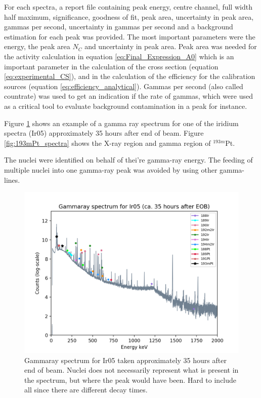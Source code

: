 For each spectra,  a report file containing peak energy, centre channel, full width half maximum, significance, goodness of fit, peak area, uncertainty in peak area, gammas per second, uncertainty in gammas per second and a background estimation for each peak was provided. The most important parameters were the energy, the peak area $N_C$ and uncertainty in peak area. Peak area was needed for the activity calculation in equation \ref{eq:Final_Expression_A0} which is an important parameter in the calculation of the cross section (equation \ref{eq:experimental_CS}), and in the calculation of the efficiency for the calibration sources (equation \ref{eq:efficiency_analytical}). Gammas per second (also called countrate) was used to get an indication if the rate of gammas, which were used as a critical tool to evaluate background contamination in a peak for instance. 

Figure \ref{fig:gammarayspectrum_example} shows an example of a gamma ray spectrum for one of the iridium spectra (Ir05) approximately 35 hours after end of beam. Figure \ref{fig:193mPt_spectra} shows the X-ray region and gamma region of $^{193m}$Pt. 

The nuclei were identified on behalf of thei're gamma-ray energy. The feeding of multiple nuclei into one gamma-ray peak was avoided by using other gamma-lines. 

\begin{figure}
    \centering
    \includegraphics{Analysis/gammaray_spec_Ir05.png}
    \caption{Gammaray spectrum for Ir05 taken approximately 35 hours after end of beam. Nuclei does not necessarily represent what is present in the spectrum, but where the peak would have been. Hard to include all since there are different decay times. }
    \label{fig:gammarayspectrum_example}
\end{figure}


